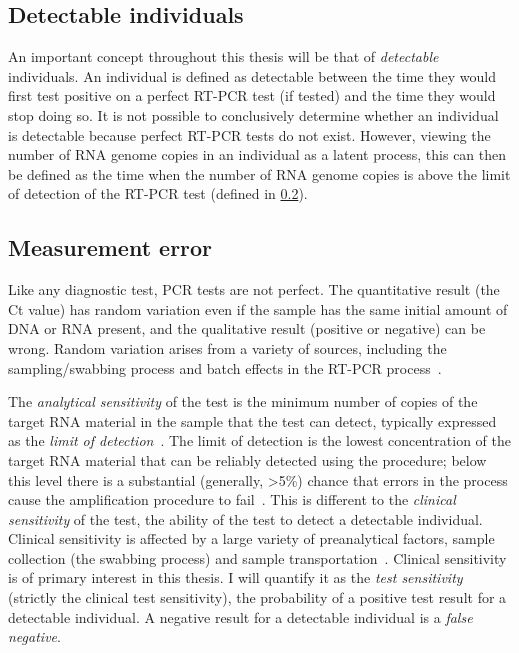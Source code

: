 \documentclass[thesis.tex]{subfiles}
\begin{document}
\subsection{Detectable individuals} \label{biology-data:sec:detectable}

An important concept throughout this thesis will be that of \emph{detectable} individuals.
An individual is defined as detectable between the time they would first test positive on a perfect RT-PCR test (if tested) and the time they would stop doing so.
It is not possible to conclusively determine whether an individual is detectable because perfect RT-PCR tests do not exist.
However, viewing the number of RNA genome copies in an individual as a latent process, this can then be defined as the time when the number of RNA genome copies is above the limit of detection of the RT-PCR test (defined in \cref{biology-data:sec:measurement-error}).


\subsection{Measurement error} \label{biology-data:sec:measurement-error}

Like any diagnostic test, PCR tests are not perfect.
The quantitative result (the Ct value) has random variation even if the sample has the same initial amount of DNA or RNA present, and the qualitative result (positive or negative) can be wrong.
Random variation arises from a variety of sources, including the sampling/swabbing process and batch effects in the RT-PCR process~\autocite{hanRTPCR}.

The \emph{analytical sensitivity} of the test is the minimum number of copies of the target RNA material in the sample that the test can detect, typically expressed as the \emph{limit of detection}~\autocite{bustinMIQE}.
The limit of detection is the lowest concentration of the target RNA material that can be reliably detected using the procedure; below this level there is a substantial (generally, >5\%) chance that errors in the process cause the amplification procedure to fail~\autocite{forootanLOD}.
This is different to the \emph{clinical sensitivity} of the test, the ability of the test to detect a detectable individual.
Clinical sensitivity is affected by a large variety of preanalytical factors, \eg sample collection (\ie the swabbing process) and sample transportation~\autocite{lippiPotential}.
Clinical sensitivity is of primary interest in this thesis.
I will quantify it as the \emph{test sensitivity} (strictly the clinical test sensitivity), the probability of a positive test result for a detectable individual.
A negative result for a detectable individual is a \emph{false negative}.
\end{document}
